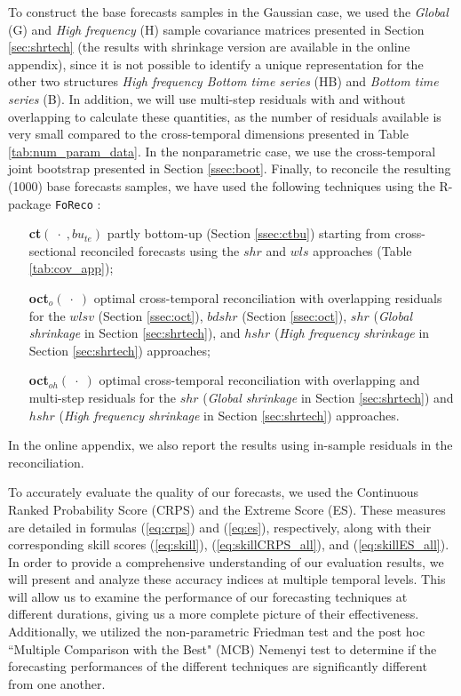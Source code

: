 \documentclass[a4paper,11pt]{article}
\theoremstyle{definition}
\begin{document}
To construct the base forecasts samples in the Gaussian case, we used the \textit{Global} (G) and \textit{High frequency} (H) sample covariance matrices presented in Section \ref{sec:shrtech} (the results with shrinkage version are available in the online appendix), since it is not possible to identify a unique representation \citep{giro2022} for the other two structures \textit{High frequency Bottom time series} (HB) and \textit{Bottom time series} (B). In addition, we will use multi-step residuals with and without overlapping to calculate these quantities, as the number of residuals available is very small compared to the cross-temporal dimensions presented in Table \ref{tab:num_param_data}. In the nonparametric case, we use the cross-temporal joint bootstrap presented in Section \ref{ssec:boot}.
Finally, to reconcile the resulting (1000) base forecasts samples, we have used the following techniques using the \textsf{R}-package \texttt{FoReco} \citep{girolimetto2022}:
\begin{itemize}[nosep, leftmargin = 2.5cm]
	\item[\textbf{ct}$(\;\cdot\;, bu_{te})$] partly bottom-up (Section \ref{ssec:ctbu}) starting from cross-sectional reconciled forecasts using the $shr$ and $wls$ approaches (Table \ref{tab:cov_app});
	\item[\textbf{oct}$_o(\;\cdot\;)$] optimal cross-temporal reconciliation with overlapping residuals for the $wlsv$ (Section \ref{ssec:oct}), $bdshr$ (Section \ref{ssec:oct}), $shr$ (\textit{Global shrinkage} in Section \ref{sec:shrtech}), and $hshr$ (\textit{High frequency shrinkage} in Section \ref{sec:shrtech}) approaches;
	\item[\textbf{oct}$_{oh}(\;\cdot\;)$] optimal cross-temporal reconciliation with overlapping and multi-step residuals for the $shr$ (\textit{Global shrinkage} in Section \ref{sec:shrtech}) and $hshr$ (\textit{High frequency shrinkage} in Section \ref{sec:shrtech}) approaches.
\end{itemize}
In the online appendix, we also report the results using in-sample residuals in the reconciliation.

To accurately evaluate the quality of our forecasts, we used the Continuous Ranked Probability Score (CRPS) and the Extreme Score (ES). These measures are detailed in formulas (\ref{eq:crps}) and (\ref{eq:es}), respectively, along with their corresponding skill scores (\ref{eq:skill}), (\ref{eq:skillCRPS_all}), and (\ref{eq:skillES_all}).
In order to provide a comprehensive understanding of our evaluation results, we will present and analyze these accuracy indices at multiple temporal levels. This will allow us to examine the performance of our forecasting techniques at different durations, giving us a more complete picture of their effectiveness.
Additionally, we utilized the non-parametric Friedman test and the post hoc “Multiple Comparison with the Best" (MCB) Nemenyi test \citep{koning2005, kourentzes2019, makridakis2022} to determine if the forecasting performances of the different techniques are significantly different from one another.
\end{document}

